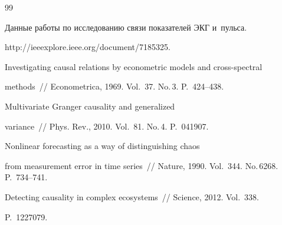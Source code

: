 {\small\frenchspacing

{%


\begin{thebibliography}{99}


Данные работы по исследованию связи показателей ЭКГ и~пульса. 

{\sf http://\linebreak ieeexplore.ieee.org/document/7185325.}






Investigating causal relations by econometric models and cross-spectral 

methods~/\!\!/ Econometrica, 1969. Vol.~37. No.\,3. P.~424--438.






Multivariate Granger causality and generalized

variance~/\!\!/ Phys. Rev., 2010. Vol.~81. No.\,4. P.~041907.










Nonlinear forecasting as a way of distinguishing chaos

from measurement error in time series~/\!\!/ Nature, 1990. Vol.~344. No.\,6268. P.~734--741.






Detecting causality in complex ecosystems~/\!\!/ Science, 2012. Vol.~338. 

P.~1227079.






\end{thebibliography}}}
